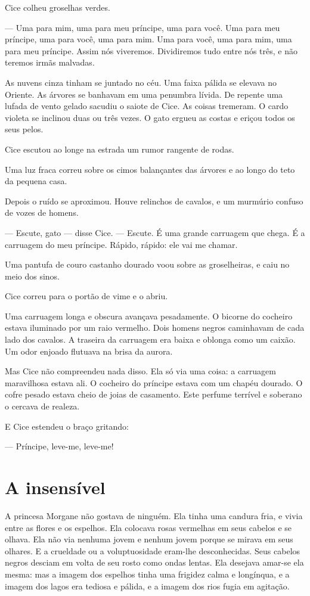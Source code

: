 Cice colheu groselhas verdes.

--- Uma para mim, uma para meu príncipe, uma para você. Uma para meu
príncipe, uma para você, uma para mim. Uma para você, uma para mim, uma
para meu príncipe. Assim nós viveremos. Dividiremos tudo entre nós três, e
não teremos irmãs malvadas.


As nuvens cinza tinham se juntado no céu. Uma faixa pálida se elevava
no Oriente. As árvores se banhavam em uma penumbra lívida. De repente uma
lufada de vento gelado sacudiu o saiote de Cice. As coisas tremeram. O
cardo violeta se inclinou duas ou três vezes. O gato ergueu as costas e
eriçou todos os seus pelos.

Cice escutou ao longe na estrada um rumor rangente de rodas.

Uma luz fraca correu sobre os cimos balançantes das árvores e ao longo
do teto da pequena casa.

Depois o ruído se aproximou. Houve relinchos de cavalos, e um murmúrio
confuso de vozes de homens.

--- Escute, gato --- disse Cice.  --- Escute. É uma grande carruagem que chega.
É a carruagem do meu príncipe. Rápido, rápido: ele vai me chamar.

Uma pantufa de couro castanho dourado voou sobre as groselheiras, e
caiu no meio dos sinos.

Cice correu para o portão de vime e o abriu.

Uma carruagem longa e obscura avançava pesadamente. O bicorne do
cocheiro estava iluminado por um raio vermelho. Dois homens negros caminhavam
de cada lado dos cavalos. A traseira da carruagem era baixa e oblonga como
um caixão. Um odor enjoado flutuava na brisa da aurora.

Mas Cice não compreendeu nada disso. Ela só via uma coisa: a carruagem
maravilhosa estava ali. O cocheiro do príncipe estava com um chapéu
dourado. O cofre pesado estava cheio de joias de casamento. Este perfume
terrível e soberano o cercava de realeza.

E Cice estendeu o braço gritando:

--- Príncipe, leve-me, leve-me!

\section*{A insensível}

A princesa Morgane não gostava de ninguém. Ela tinha uma candura fria,
e vivia entre as flores e os espelhos. Ela colocava rosas vermelhas em
seus cabelos e se olhava. Ela não via nenhuma jovem e nenhum jovem porque
se mirava em seus olhares. E a crueldade ou a voluptuosidade eram-lhe
desconhecidas. Seus cabelos negros desciam em volta de seu rosto como
ondas lentas. Ela desejava amar-se ela mesma: mas a imagem dos espelhos
tinha uma frigidez calma e longínqua, e a imagem dos lagos era tediosa e
pálida, e a imagem dos rios fugia em agitação.

